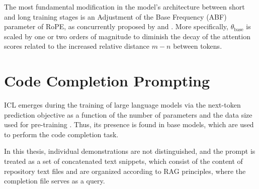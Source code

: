 The most fundamental modification in the model's architecture between short and long training stages is an Adjustment of the Base Frequency (ABF) parameter of RoPE, as concurrently proposed by \citet{rozière2023} and \citet{xiong2023}. More specifically, \(\theta_{\mathrm{base}}\) is scaled by one or two orders of magnitude to diminish the decay of the attention scores related to the increased relative distance \(m - n\) between tokens.

\section{Code Completion Prompting}

ICL emerges during the training of large language models via the next-token prediction objective as a function of the number of parameters and the data size used for pre-training \parencite{hahn2023}. Thus, its presence is found in base models, which are used to perform the code completion task.

In this thesis, individual demonstrations are not distinguished, and the prompt is treated as a set of concatenated text snippets, which consist of the content of repository text files and are organized according to RAG principles, where the completion file serves as a query.
